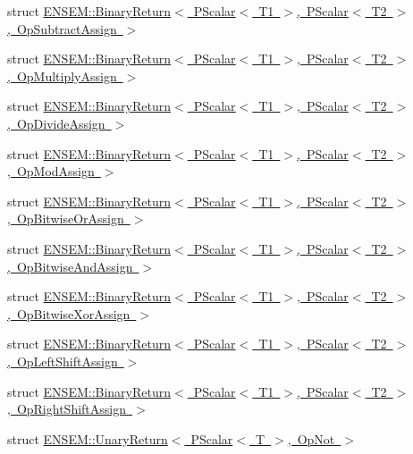 \begin{DoxyCompactItemize}
\item 
struct \mbox{\hyperlink{structENSEM_1_1BinaryReturn_3_01PScalar_3_01T1_01_4_00_01PScalar_3_01T2_01_4_00_01OpSubtractAssign_01_4}{E\+N\+S\+E\+M\+::\+Binary\+Return$<$ P\+Scalar$<$ T1 $>$, P\+Scalar$<$ T2 $>$, Op\+Subtract\+Assign $>$}}
\item 
struct \mbox{\hyperlink{structENSEM_1_1BinaryReturn_3_01PScalar_3_01T1_01_4_00_01PScalar_3_01T2_01_4_00_01OpMultiplyAssign_01_4}{E\+N\+S\+E\+M\+::\+Binary\+Return$<$ P\+Scalar$<$ T1 $>$, P\+Scalar$<$ T2 $>$, Op\+Multiply\+Assign $>$}}
\item 
struct \mbox{\hyperlink{structENSEM_1_1BinaryReturn_3_01PScalar_3_01T1_01_4_00_01PScalar_3_01T2_01_4_00_01OpDivideAssign_01_4}{E\+N\+S\+E\+M\+::\+Binary\+Return$<$ P\+Scalar$<$ T1 $>$, P\+Scalar$<$ T2 $>$, Op\+Divide\+Assign $>$}}
\item 
struct \mbox{\hyperlink{structENSEM_1_1BinaryReturn_3_01PScalar_3_01T1_01_4_00_01PScalar_3_01T2_01_4_00_01OpModAssign_01_4}{E\+N\+S\+E\+M\+::\+Binary\+Return$<$ P\+Scalar$<$ T1 $>$, P\+Scalar$<$ T2 $>$, Op\+Mod\+Assign $>$}}
\item 
struct \mbox{\hyperlink{structENSEM_1_1BinaryReturn_3_01PScalar_3_01T1_01_4_00_01PScalar_3_01T2_01_4_00_01OpBitwiseOrAssign_01_4}{E\+N\+S\+E\+M\+::\+Binary\+Return$<$ P\+Scalar$<$ T1 $>$, P\+Scalar$<$ T2 $>$, Op\+Bitwise\+Or\+Assign $>$}}
\item 
struct \mbox{\hyperlink{structENSEM_1_1BinaryReturn_3_01PScalar_3_01T1_01_4_00_01PScalar_3_01T2_01_4_00_01OpBitwiseAndAssign_01_4}{E\+N\+S\+E\+M\+::\+Binary\+Return$<$ P\+Scalar$<$ T1 $>$, P\+Scalar$<$ T2 $>$, Op\+Bitwise\+And\+Assign $>$}}
\item 
struct \mbox{\hyperlink{structENSEM_1_1BinaryReturn_3_01PScalar_3_01T1_01_4_00_01PScalar_3_01T2_01_4_00_01OpBitwiseXorAssign_01_4}{E\+N\+S\+E\+M\+::\+Binary\+Return$<$ P\+Scalar$<$ T1 $>$, P\+Scalar$<$ T2 $>$, Op\+Bitwise\+Xor\+Assign $>$}}
\item 
struct \mbox{\hyperlink{structENSEM_1_1BinaryReturn_3_01PScalar_3_01T1_01_4_00_01PScalar_3_01T2_01_4_00_01OpLeftShiftAssign_01_4}{E\+N\+S\+E\+M\+::\+Binary\+Return$<$ P\+Scalar$<$ T1 $>$, P\+Scalar$<$ T2 $>$, Op\+Left\+Shift\+Assign $>$}}
\item 
struct \mbox{\hyperlink{structENSEM_1_1BinaryReturn_3_01PScalar_3_01T1_01_4_00_01PScalar_3_01T2_01_4_00_01OpRightShiftAssign_01_4}{E\+N\+S\+E\+M\+::\+Binary\+Return$<$ P\+Scalar$<$ T1 $>$, P\+Scalar$<$ T2 $>$, Op\+Right\+Shift\+Assign $>$}}
\item 
struct \mbox{\hyperlink{structENSEM_1_1UnaryReturn_3_01PScalar_3_01T_01_4_00_01OpNot_01_4}{E\+N\+S\+E\+M\+::\+Unary\+Return$<$ P\+Scalar$<$ T $>$, Op\+Not $>$}}

\end{DoxyCompactItemize}
